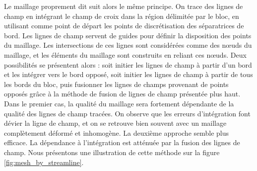 Le maillage proprement dit suit alors le même principe. On trace des lignes de champ en intégrant le champ de croix dans la région délimitée par le bloc, en utilisant comme point de départ les points de discrétisation des séparatrices de bord. Les lignes de champ servent de guides pour définir la disposition des points du maillage. Les intersections de ces lignes sont considérées comme des nœuds du maillage, et les éléments du maillage sont construits en reliant ces nœuds. Deux possibilités se présentent alors : soit initier les lignes de champ à partir d'un bord et les intégrer vers le bord opposé, soit initier les lignes de champ à partir de tous les bords du bloc, puis fusionner les lignes de champs provenant de points opposés grâce à la méthode de fusion de lignes de champ présentée plus haut. Dans le premier cas, la qualité du maillage sera fortement dépendante de la qualité des lignes de champ tracées. On observe que les erreurs d'intégration font dévier la ligne de champ, et on se retrouve bien souvent avec un maillage complètement déformé et inhomogène. La deuxième approche semble plus efficace. La dépendance à l'intégration est atténuée par la fusion des lignes de champ. Nous présentons une illustration de cette méthode sur la figure \ref{fig:mesh_by_streamline}.

